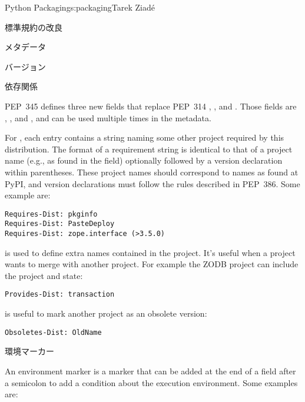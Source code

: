 \begin{aosachapter}{Python Packaging}{s:packaging}{Tarek Ziad\'{e}}
\begin{aosasect1}{標準規約の改良}
\begin{aosasect2}{メタデータ}
\begin{aosasect3}{バージョン}
\end{aosasect3}

\begin{aosasect3}{依存関係}

PEP~345 defines three new fields that replace PEP~314 ,
, and . Those fields are
, , and ,
and can be used multiple times in the metadata.

For , each entry contains a string naming some
other  project required by this distribution.  The
format of a requirement string is identical to that of a
 project name (e.g., as found in the  field)
optionally followed by a version declaration within parentheses.
These  project names should correspond to names as
found at PyPI, and version declarations must follow the rules
described in PEP~386. Some example are:

\begin{verbatim}
Requires-Dist: pkginfo
Requires-Dist: PasteDeploy
Requires-Dist: zope.interface (>3.5.0)
\end{verbatim}

\noindent {} is used to define extra names contained in the
project.  It's useful when a project wants to merge with another
project. For example the ZODB project can include the
 project and state:

\begin{verbatim}
Provides-Dist: transaction
\end{verbatim}

\noindent {} is useful to mark another project as an obsolete
version:

\begin{verbatim}
Obsoletes-Dist: OldName
\end{verbatim}

\end{aosasect3}

\begin{aosasect3}{環境マーカー}

An environment marker is a marker that can be added at the end of a
field after a semicolon to add a condition about the execution
environment.  Some examples are:


\end{aosasect3}
\end{aosasect2}
\end{aosasect1}
\end{aosachapter}
